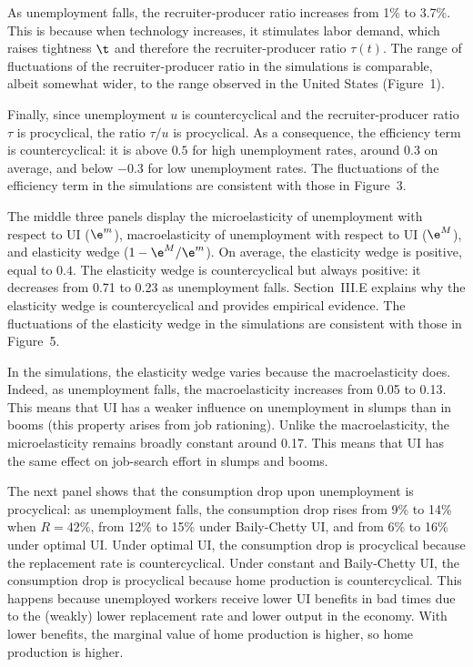 \documentclass[letterpaper,12pt,leqno]{article}
\begin{document}
As unemployment falls, the recruiter-producer ratio increases from 1\% to 3.7\%. This is because when technology increases, it stimulates labor demand, which raises tightness $\t$ and therefore the recruiter-producer ratio $\tau(t)$. The range of fluctuations of the recruiter-producer ratio in the simulations is comparable, albeit somewhat wider, to the range observed in the United States (Figure~1).

Finally, since unemployment $u$ is countercyclical and the recruiter-producer ratio $\tau$ is procyclical, the ratio $\tau/u$ is procyclical. As a consequence, the efficiency term is countercyclical: it is above $0.5$ for high unemployment rates, around $0.3$ on average, and below $-0.3$ for low unemployment rates. The fluctuations of the efficiency term in the simulations are consistent with those in Figure~3.

The middle three panels display the microelasticity of unemployment with respect to UI ($\e^{m}$), macroelasticity of unemployment with respect to UI ($\e^{M}$), and elasticity wedge ($1-\e^{M}/\e^{m}$). On average, the elasticity wedge is positive, equal to $0.4$. The elasticity wedge is countercyclical but always positive: it decreases from 0.71 to 0.23 as unemployment falls. Section~III.E explains why the elasticity wedge is countercyclical and provides empirical evidence. The fluctuations of the elasticity wedge in the simulations are consistent with those in Figure~5.

In the simulations, the elasticity wedge varies because the macroelasticity does. Indeed, as unemployment falls, the macroelasticity increases from 0.05 to 0.13. This means that UI has a weaker influence on unemployment in slumps than in booms (this property arises from job rationing). Unlike the macroelasticity, the microelasticity remains broadly constant around 0.17. This means that UI has the same effect on job-search effort in slumps and booms.  

The next panel shows that the consumption drop upon unemployment is procyclical: as unemployment falls, the consumption drop rises from 9\% to 14\% when $R=42\%$, from 12\% to 15\% under Baily-Chetty UI, and from 6\% to 16\% under optimal UI. Under optimal UI, the consumption drop is procyclical because the replacement rate is countercyclical. Under constant and Baily-Chetty UI, the consumption drop is procyclical because home production is countercyclical. This happens because unemployed workers receive lower UI benefits in bad times due to the (weakly) lower replacement rate and lower output in the economy. With lower benefits, the marginal value of home production is higher, so home production is higher.
\end{document}
